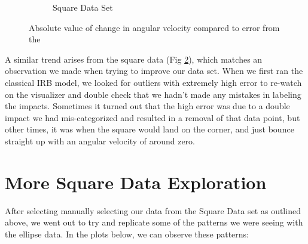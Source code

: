 \documentclass{article}
\begin{document}
\begin{figure}[h!]
\begin{subfigure}[b]{0.45\linewidth}
            \caption{Square Data Set}
            \label{fig:changeInOmegaSquare}
    \end{subfigure}
    \caption{Absolute value of change in angular velocity compared to error from the}
\end{figure}

\noindent A similar trend arises from the square data (Fig \ref{fig:changeInOmegaSquare}), which matches an observation we made when trying to improve our data set. When we first ran the classical IRB model, we looked for outliers with extremely high error to re-watch on the visualizer and double check that we hadn't made any mistakes in labeling the impacts. Sometimes it turned out that the high error was due to a double impact we had mis-categorized and resulted in a removal of that data point, but other times, it was when the square would land on the corner, and just bounce straight up with an angular velocity of around zero.

\newpage
\section{More Square Data Exploration}
After selecting manually selecting our data from the Square Data set as outlined above, we went out to try and replicate some of the patterns we were seeing with the ellipse data. In the plots below, we can observe these patterns:  
\end{document}
